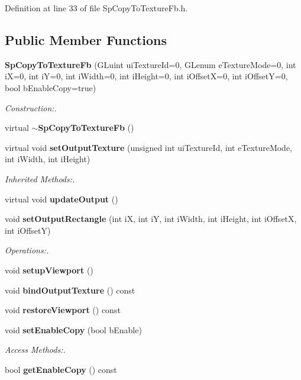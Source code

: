 Definition at line 33 of file Sp\-Copy\-To\-Texture\-Fb.h.\subsection*{Public Member Functions}
\begin{CompactItemize}
\item 
{\bf Sp\-Copy\-To\-Texture\-Fb} (GLuint ui\-Texture\-Id=0, GLenum e\-Texture\-Mode=0, int i\-X=0, int i\-Y=0, int i\-Width=0, int i\-Height=0, int i\-Offset\-X=0, int i\-Offset\-Y=0, bool b\-Enable\-Copy=true)
\begin{CompactList}\small\item\em Construction:. \item\end{CompactList}\item 
virtual {\bf $\sim$Sp\-Copy\-To\-Texture\-Fb} ()
\item 
virtual void {\bf set\-Output\-Texture} (unsigned int ui\-Texture\-Id, int e\-Texture\-Mode, int i\-Width, int i\-Height)
\begin{CompactList}\small\item\em Inherited Methods:. \item\end{CompactList}\item 
virtual void {\bf update\-Output} ()
\item 
void {\bf set\-Output\-Rectangle} (int i\-X, int i\-Y, int i\-Width, int i\-Height, int i\-Offset\-X, int i\-Offset\-Y)
\begin{CompactList}\small\item\em Operations:. \item\end{CompactList}\item 
void {\bf setup\-Viewport} ()
\item 
void {\bf bind\-Output\-Texture} () const
\item 
void {\bf restore\-Viewport} () const
\item 
void {\bf set\-Enable\-Copy} (bool b\-Enable)
\begin{CompactList}\small\item\em Access Methods:. \item\end{CompactList}\item 
bool {\bf get\-Enable\-Copy} () const
\end{CompactItemize}
